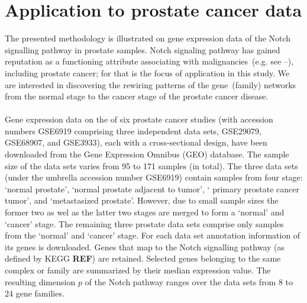 \documentclass[10pt]{article}
\newcommand{\red}[1]{{\textcolor {red} {#1}}}
\begin{document}


\section{Application to prostate cancer data}\label{application}
The presented methodology is illustrated on gene expression data of the Notch signalling pathway in prostate samples. %
Notch signaling pathway has gained reputation as a functioning attribute associating with malignancies~(e.g. see \citet{leong2006recent}--\citet{espinoza2013notch}), including prostate cancer; for that is the focus of application in this study. We are interested in discovering the rewiring patterns of the gene~(family) networks from the normal stage to the cancer stage of the prostate cancer disease. 
\\
\\
Gene expression data on the of six prostate cancer studies (with accession numbers GSE6919 comprising three independent data sets,  GSE29079, GSE68907, and GSE3933), each with a cross-sectional design, have been downloaded from the Gene Expression Omnibus (GEO) database. The sample size of the data sets varies from 95 to 171 samples (in total). The three data sets (under the umbrella accession number GSE6919) contain samples from four stage: `normal prostate', `normal prostate adjacent to tumor', ` primary prostate cancer tumor', and `metastasized prostate'. However, due to small sample sizes the former two as wel as the latter two stages are merged to form a `normal'  and `cancer' stage. The remaining three prostate data sets comprise only samples from the `normal'  and `cancer' stage. For each data set annotation information of its genes is downloaded. Genes that map to the Notch signalling pathway (as defined by KEGG \textbf{REF}) are retained. Selected genes belonging to the same complex or family are summarized by their median expression value. The resulting dimension $p$ of the Notch pathway ranges over the data sets from 8 to 24 gene families.
\\

\end{document}
